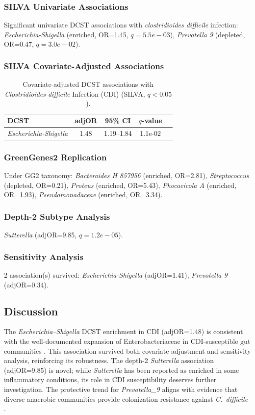 \documentclass[11pt,a4paper]{article}
\begin{document}
\subsubsection{SILVA Univariate Associations}
Significant univariate DCST associations with \textit{clostridioides difficile} infection: \textit{Escherichia-Shigella} (enriched, OR=1.45, $q=5.5e-03$), \textit{Prevotella 9} (depleted, OR=0.47, $q=3.0e-02$).

\subsubsection{SILVA Covariate-Adjusted Associations}
\begin{table}[H]\centering\small
\caption{Covariate-adjusted DCST associations with \textit{Clostridioides difficile} Infection (CDI) (SILVA, $q<0.05$).}\label{tab:CDI_adj}
\begin{tabular}{lcccc}
\toprule
DCST & adjOR & 95\% CI & $q$-value \\
\midrule
\textit{Escherichia-Shigella} & 1.48 & 1.19--1.84 & 1.1e-02 \\
\bottomrule
\end{tabular}\end{table}

\subsubsection{GreenGenes2 Replication}
Under GG2 taxonomy: \textit{Bacteroides H 857956} (enriched, OR=2.81), \textit{Streptococcus} (depleted, OR=0.21), \textit{Proteus} (enriched, OR=5.43), \textit{Phocaeicola A} (enriched, OR=1.93), \textit{Pseudomonadaceae} (enriched, OR=3.34).

\subsubsection{Depth-2 Subtype Analysis}
\textit{Sutterella} (adjOR=9.85, $q=1.2e-05$).

\subsubsection{Sensitivity Analysis}
2 association(s) survived: \textit{Escherichia-Shigella} (adjOR=1.41), \textit{Prevotella 9} (adjOR=0.34).

\subsection{Discussion}
The \textit{Escherichia--Shigella} DCST enrichment in CDI (adjOR=1.48) is consistent with the well-documented expansion of Enterobacteriaceae in CDI-susceptible gut communities \cite{Schubert2014_CDI}. This association survived both covariate adjustment and sensitivity analysis, reinforcing its robustness. The depth-2 \textit{Sutterella} association (adjOR=9.85) is novel; while \textit{Sutterella} has been reported as enriched in some inflammatory conditions, its role in CDI susceptibility deserves further investigation. The protective trend for \textit{Prevotella\_9} aligns with evidence that diverse anaerobic communities provide colonization resistance against \textit{C.\ difficile} \cite{Sehgal2021_CDI,Seekatz2014_FMT}.
\newpage
\end{document}
